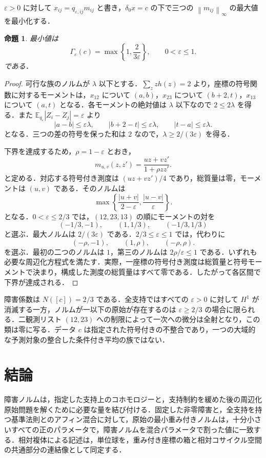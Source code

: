 \documentclass[11pt,a4paper]{article}
\numberwithin{equation}{section}
\theoremstyle{japanese}
\newtheorem{proposition}[theorem]{命題}
\theoremstyle{remark}
\newcommand{\norm}[1]{\left\lVert #1\right\rVert}
\begin{document}
$\varepsilon>0$ に対して $x_{ij}=q_{\varepsilon,ij}m_{ij}$ と書き，$\delta_0x=c$ の下で三つの $\norm{m_{ij}}_\infty$ の最大値を最小化する．
\begin{proposition}\label{prop:triangle}
最小値は
\begin{equation}\label{eq:triangle}
 \Gamma_\varepsilon(c)=\max\left\{1,\frac{2}{3\varepsilon}\right\},
 \qquad 0<\varepsilon\le1.
\end{equation}
である．
\end{proposition}
\begin{proof}
可行な族のノルムが $\lambda$ 以下とする．$\sum_z zh(z)=2$ より，座標の符号関数に対するモーメントは，$x_{12}$ について $(a,b)$，$x_{23}$ について $(b+2,t)$，$x_{13}$ について $(a,t)$ となる．各モーメントの絶対値は $\lambda$ 以下なので $2\le2\lambda$ を得る．また $\mathbb E_{q_\varepsilon}|Z_i-Z_j|=\varepsilon$ より
\[
 |a-b|\le\varepsilon\lambda,\qquad
 |b+2-t|\le\varepsilon\lambda,\qquad
 |t-a|\le\varepsilon\lambda.
\]
となる．三つの差の符号を保った和は $2$ なので，$\lambda\ge2/(3\varepsilon)$ を得る．

下界を達成するため，$\rho=1-\varepsilon$ とおき，
\[
 m_{u,v}(z,z')=\frac{uz+vz'}{1+\rho zz'}.
\]
と定める．対応する符号付き測度は $(uz+vz')/4$ であり，総質量は零，モーメントは $(u,v)$ である．そのノルムは
\[
 \max\left\{\frac{|u+v|}{2-\varepsilon},\frac{|u-v|}{\varepsilon}\right\}.
\]
となる．$0<\varepsilon\le2/3$ では，$(12,23,13)$ の順にモーメントの対を
\[
 (-1/3,-1),\qquad (1,1/3),\qquad(-1/3,1/3)
\]
と選ぶ．最大ノルムは $2/(3\varepsilon)$ である．$2/3\le\varepsilon\le1$ では，代わりに
\[
 (-\rho,-1),\qquad(1,\rho),\qquad(-\rho,\rho).
\]
を選ぶ．最初の二つのノルムは $1$，第三のノルムは $2\rho/\varepsilon\le1$ である．いずれも必要な周辺化方程式を満たす．実際，一座標の符号付き測度は総質量と符号モーメントで決まり，構成した測度の総質量はすべて零である．したがって各区間で下界が達成される．
\end{proof}
障害係数は $N([c])=2/3$ である．全支持ではすべての $\varepsilon>0$ に対して $H^1$ が消滅する一方，ノルムが一以下の原始が存在するのは $\varepsilon\ge2/3$ の場合に限られる．二観測リスト $(12,23)$ への制限によって一次への微分は全射となり，この類は零に写る．データ $c$ は指定された符号付きの不整合であり，一つの大域的な予測対象の整合した条件付き平均の族ではない．

\section{結論}
障害ノルムは，指定した支持上のコホモロジーと，支持制約を緩めた後の周辺化原始問題を解くために必要な量を結び付ける．固定した非零障害と，全支持を持つ基準法則とのアフィン混合に対して，原始の最小重み付きノルムは，十分小さいすべての正のパラメータで，障害ノルムを混合パラメータで割った値に一致する．相対複体による記述は，単位球を，重み付き座標の箱と相対コサイクル空間の共通部分の連結像として同定する．
\end{document}
